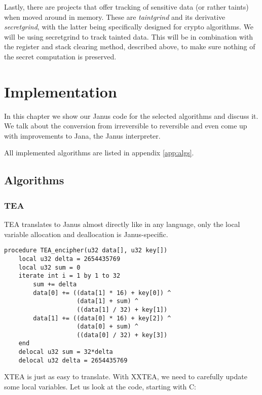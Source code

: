 \documentclass[a4paper,10pt,openright]{memoir}
\newcommand{\term}[1]{\textit{#1}}
\begin{document}
Lastly, there are projects that offer tracking of sensitive data (or 
rather taints) when moved 
around in memory. These are \term{taintgrind} and its derivative 
\term{secretgrind}, with the latter being specifically designed for 
crypto algorithms. We will be using secretgrind to track tainted data. 
This will be in combination with the register and stack clearing 
method, described above, to make sure nothing of the secret computation 
is preserved.



\chapter{Implementation}

In this chapter we show our Janus code for the selected algorithms and 
discuss it. We talk about the conversion from irreversible to 
reversible and even come up with improvements to Jana, the Janus 
interpreter.

All implemented algorithms are listed in appendix \ref{app:algs}.

\section{Algorithms}

\subsection{TEA}
\label{sec:impl:tea}

TEA translates to Janus almost directly like in any language, only the 
local variable allocation and deallocation is Janus-specific.

\begin{lstlisting}[language=Janus]
procedure TEA_encipher(u32 data[], u32 key[])
    local u32 delta = 2654435769
    local u32 sum = 0
    iterate int i = 1 by 1 to 32
        sum += delta
        data[0] += ((data[1] * 16) + key[0]) ^
                    (data[1] + sum) ^
                    ((data[1] / 32) + key[1])
        data[1] += ((data[0] * 16) + key[2]) ^
                    (data[0] + sum) ^
                    ((data[0] / 32) + key[3])
    end
    delocal u32 sum = 32*delta
    delocal u32 delta = 2654435769
\end{lstlisting}

XTEA is just as easy to translate. With XXTEA, we need to carefully 
update some local variables. Let us look at the code, starting with C:
\end{document}
